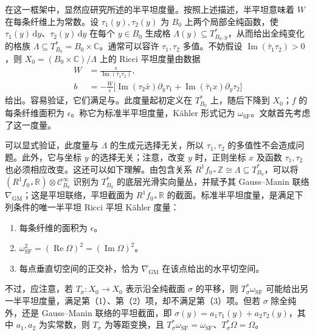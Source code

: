 在这一框架中，显然应研究所述的半平坦度量。按照上述描述，半平坦意味着 $W$ 在每条纤维上为常数。设 $\tau_1(y),\tau_2(y)$ 为 $B_0$ 上两个局部全纯函数，使 $\tau_1(y)\,\mathrm dy$、$\tau_2(y)\,\mathrm dy$ 在每个 $y\in B_0$ 生成格 $\Lambda(y)\subseteq T^*_{B_0,y}$，从而给出全纯变化的格族 $\Lambda\subseteq T^*_{B_0}=B_0\times\mathbb C$。通常可以容许 $\tau_1,\tau_2$ 多值。不妨假设 $\operatorname{Im}(\bar\tau_1\tau_2)>0$，则 $X_0=(B_0\times\mathbb C)/\Lambda$ 上的 Ricci 平坦度量由数据
\[
\begin{aligned}
W&=\frac\epsilon{\operatorname{Im}(\bar\tau_1\tau_2)},\\
b&=-\frac W\epsilon\bigl[
\operatorname{Im}(\tau_2\bar x)\partial_y\tau_1
+\operatorname{Im}(\bar\tau_1x)\partial_y\tau_2\bigr]
\end{aligned}
\]
给出。容易验证，它们满足与。此度量起初定义在 $T^*_{B_0}$ 上，随后下降到 $X_0$；$f$ 的每条纤维面积为 $\epsilon$。称它为标准半平坦度量，Kähler 形式记为 $\omega_{\mathrm{SF}}$。文献首先考虑了这一度量。

可以显式验证，此度量与 $\Lambda$ 的生成元选择无关，所以 $\tau_1,\tau_2$ 的多值性不会造成问题。此外，它与坐标 $y$ 的选择无关；注意，改变 $y$ 时，正则坐标 $x$ 及函数 $\tau_1,\tau_2$ 也必须相应改变。这还可以如下理解。由包含关系 $R^1f_{0*}\mathbb Z\cong\Lambda\subseteq T^*_{B_0}$，可以将 $(R^1f_{0*}\mathbb R)\otimes\mathcal C^\infty_{B_0}$ 识别为 $T^*_{B_0}$ 的底层光滑实向量丛，并赋予其 Gauss--Manin 联络 $\nabla_{\mathrm{GM}}$；这是平坦联络，平坦截面为 $R^1f_{0*}\mathbb R$ 的截面。标准半平坦度量，是满足下列条件的唯一半平坦 Ricci 平坦 Kähler 度量：
\begin{enumerate}
\item 每条纤维的面积为 $\epsilon$。
\item $\omega_{\mathrm{SF}}^2=(\operatorname{Re}\Omega)^2=(\operatorname{Im}\Omega)^2$。
\item 每点垂直切空间的正交补，恰为 $\nabla_{\mathrm{GM}}$ 在该点给出的水平切空间。
\end{enumerate}

不过，应注意，若 $T_\sigma\colon X_0\to X_0$ 表示沿全纯截面 $\sigma$ 的平移，则 $T_\sigma^*\omega_{\mathrm{SF}}$ 可能给出另一半平坦度量，满足第（1）、第（2）项，却不满足第（3）项。但若 $\sigma$ 除全纯外，还是 Gauss--Manin 联络的平坦截面，即 $\sigma(y)=a_1\tau_1(y)+a_2\tau_2(y)$，其中 $a_1,a_2$ 为实常数，则 $T_\sigma$ 为等距变换，且 $T_\sigma^*\omega_{\mathrm{SF}}=\omega_{\mathrm{SF}}$、$T_\sigma^*\Omega=\Omega$。

